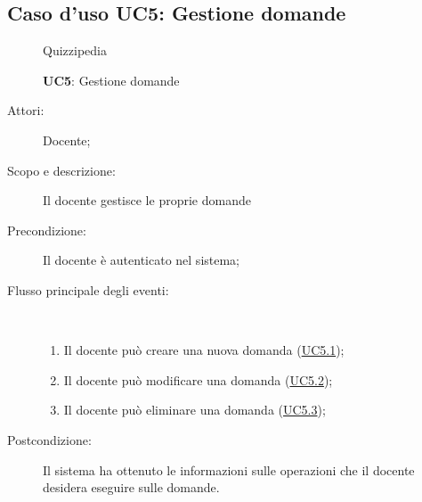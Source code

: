 \subsection{Caso d'uso UC5: Gestione domande}
	\begin{figure}[H]
		\centering
		\begin{resizedtikzpicture}{\textwidth}
		\begin{umlsystem}[x=0, fill=lightgray!20]{Quizzipedia}
		\end{umlsystem}
		\end{resizedtikzpicture}
		\caption{\textbf{UC5}: Gestione domande}
		\label{UC5}
	\end{figure}
\begin{description}
\item[Attori:] Docente;
\item[Scopo e descrizione:] Il docente gestisce le proprie domande
      \item[Precondizione:] Il docente è autenticato nel sistema;

        \item[Flusso principale degli eventi:] \ 
 \begin{enumerate}
          \item Il docente può creare una nuova domanda (\hyperlink{UC5.1}{UC5.1});
          \item Il docente può modificare una domanda (\hyperlink{UC5.2}{UC5.2});
          \item Il docente può eliminare una domanda (\hyperlink{UC5.3}{UC5.3});

      \end{enumerate}
    \item[Postcondizione:] Il sistema ha ottenuto le informazioni sulle operazioni che il docente desidera eseguire sulle domande.
  \end{description}
\hypertarget{UC5.1}{}
